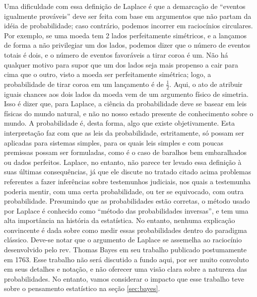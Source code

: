 Uma dificuldade com essa definição de Laplace é que a demarcação de ``eventos igualmente prováveis'' deve ser feita
com base em argumentos que não partam da idéia de probabilidade; caso contrário, podemos incorrer em raciocínios
circulares. Por exemplo, se uma moeda tem 2 lados perfeitamente simétricos, e a lançamos de forma a não privilegiar um dos lados,
podemos dizer que o número de eventos totais é dois, e o número de eventos favoráveis a tirar coroa é um. Não há qualquer motivo
para supor que um dos lados seja mais propenso a cair para cima que o outro, visto a moeda ser perfeitamente simétrica; logo,
a probabilidade de tirar coroa em um lançamento é de $\frac{1}{2}$. Aqui, o ato de atribuir iguais chances aos dois
lados da moeda vem de um argumento físico de simetria. Isso é dizer que, para Laplace,
a ciência da probabilidade deve se basear em leis físicas do mundo natural, e não no nosso estado presente de conhecimento 
sobre o mundo. A probabilidade é, desta forma, algo que existe objetivamente.
Esta interpretação faz com que as leis da probabilidade, estritamente, só possam ser aplicadas para 
sistemas simples, para os quais leis simples e com poucas premissas possam ser formuladas,
como é o caso de baralhos bem embaralhados ou dados perfeitos.
Laplace, no entanto, não parece ter levado essa 
definição à suas últimas consequências, já que ele discute no tratado citado acima problemas referentes a fazer inferências 
sobre testemunhos judiciais, nos 
quais a testemunha poderia mentir, com uma certa probabilidade, ou ter se equivocado, com outra probabilidade. 
Presumindo que as probabilidades estão corretas, o método usado por Laplace é conhecido como ``método das probabilidades
inversas'', e tem uma alta importância na história da estatística.  No entanto, 
nenhuma explicação convincente é dada sobre como medir essas probabilidades dentro do paradigma clássico.
Deve-se notar que o argumento de Laplace se assemelha ao raciocínio desenvolvido pelo rev. Thomas Bayes 
em seu trabalho publicado
postumamente em 1763. Esse trabalho não será discutido a fundo aqui, por ser muito convoluto em seus detalhes e notação,
e não oferecer uma visão clara sobre a natureza das probabilidades. No entanto, vamos considerar 
o impacto que esse trabalho
teve sobre o pensamento estatístico na seção \ref{sec:bayes}.

